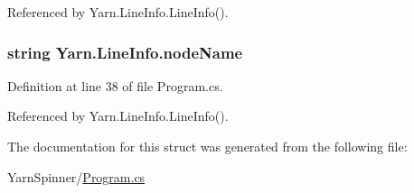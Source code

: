 Referenced by Yarn.\-Line\-Info.\-Line\-Info().

\hypertarget{a00123_a5a91331fb123e29d71d69e096f943c2f}{
\subsubsection[{node\-Name}]{\setlength{\rightskip}{0pt plus 5cm}string Yarn.\-Line\-Info.\-node\-Name}}\label{a00123_a5a91331fb123e29d71d69e096f943c2f}


Definition at line 38 of file Program.\-cs.



Referenced by Yarn.\-Line\-Info.\-Line\-Info().



The documentation for this struct was generated from the following file\-:\begin{DoxyCompactItemize}
\item 
Yarn\-Spinner/\hyperlink{a00289}{Program.\-cs}\end{DoxyCompactItemize}
